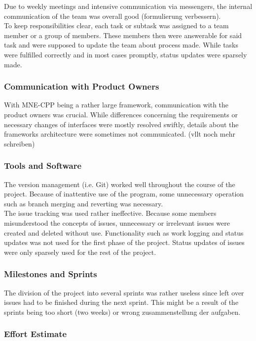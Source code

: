 Due to weekly meetings and intensive communication via messengers, the internal communication of the team was overall good (formulierung verbessern).\\
To keep responsibilities clear, each task or subtask was assigned to a team member or a group of members. These members then were answerable for said task and were supposed to update the team about process made. While tasks were fulfilled correctly and in most cases promptly, status updates were sparsely made.

\subsubsection{Communication with Product Owners}

With MNE-CPP being a rather large framework, communication with the product owners was crucial. While differences concerning the requirements or necessary changes of interfaces were mostly resolved swiftly, details about the frameworks architecture were sometimes not communicated. (vllt noch mehr schreiben)

\subsubsection{Tools and Software}

The version management (i.e. Git) worked well throughout the course of the project. Because of inattentive use of the program, some unnecessary operation such as branch merging and reverting was necessary.\\
The issue tracking was used rather ineffective. Because some members misunderstood the concepts of issues, unnecessary or irrelevant issues were created and deleted without use. Functionality such as work logging and status updates was not used for the first phase of the project. Status updates of issues were only sparsely used for the rest of the project.

\subsubsection{Milestones and Sprints}

The division of the project into several sprints was rather useless since left over issues had to be finished during the next sprint. This might be a result of the sprints being too short (two weeks) or wrong zusammenstellung der aufgaben.

\subsubsection{Effort Estimate}

